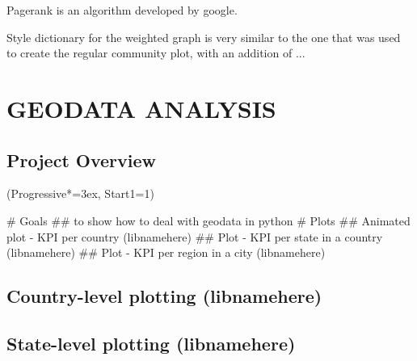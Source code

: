 \documentclass[12pt, a4paper]{article}
\let\OldEasylist\easylist
\let\OldEndEasylist\endeasylist
\renewenvironment{easylist}{%
    \OldEasylist%
    \ListProperties(Progressive*=3ex, Start1=1)%
}{%
    \OldEndEasylist%
}%
\begin{document}
Pagerank  is an algorithm developed by google.


%

Style dictionary for the weighted graph is very similar to the one that was used to create the regular community plot, with an addition of ...


%



\newpage
\section{GEODATA ANALYSIS}

\subsection{Project Overview}
\begin{easylist}
# Goals
## to show how to deal with geodata in python
# Plots
## Animated plot - KPI per country (libnamehere)
## Plot - KPI per state in a country (libnamehere)
## Plot - KPI per region in a city (libnamehere)
\end{easylist}

\subsection{Country-level plotting (libnamehere)}

\subsection{State-level plotting (libnamehere)}
\end{document}
